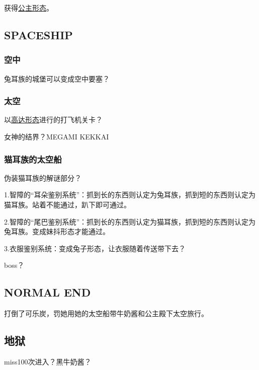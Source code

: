 \documentclass{article}
\begin{document}
获得\hyperref[costume_hime]{公主形态}。

\subsection{SPACESHIP}

\subsubsection{空中}

兔耳族的城堡可以变成空中要塞？

\subsubsection{太空}
以\hyperref[costume_gundam]{高达形态}进行的打飞机关卡？

女神的结界？MEGAMI KEKKAI

\subsubsection{猫耳族的太空船}

伪装猫耳族的解谜部分？

1.智障的“耳朵鉴别系统”：抓到长的东西则认定为兔耳族，抓到短的东西则认定为猫耳族。站着不能通过，趴下即可通过。

2.智障的“尾巴鉴别系统”：抓到长的东西则认定为猫耳族，抓到短的东西则认定为兔耳族。变成妹抖形态才能通过。

3.衣服鉴别系统：变成兔子形态，让衣服随着传送带下去？

boss？

\subsection{NORMAL END}

打倒了可乐炭，罚她用她的太空船带牛奶酱和公主殿下太空旅行。

\subsection{地狱}

miss100次进入？黑牛奶酱？
\end{document}
